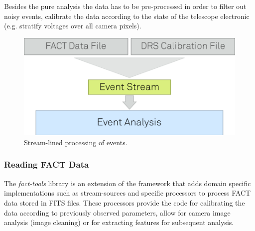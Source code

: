 Besides the pure analysis the data has to be pre-processed in order
to filter out noisy events, calibrate the data according to the state
of the telescope electronic (e.g. stratify voltages over all camera pixels).



%

\begin{figure}[h!]
\begin{center}
\includegraphics[scale=0.2]{fact-event-stream}
\end{center}
\caption{\label{fig:eventStream}Stream-lined processing of events.}
\end{figure}





\subsubsection{Reading FACT Data}
The {\em fact-tools} library is an extension of the \streams framework that
adds domain specific implementations such as stream-sources and specific 
processors to process FACT data stored in FITS files. These processors provide
the code for calibrating the data according to previously observed parameters,
allow for camera image analysis (image cleaning) or for extracting features
for subsequent analysis.

